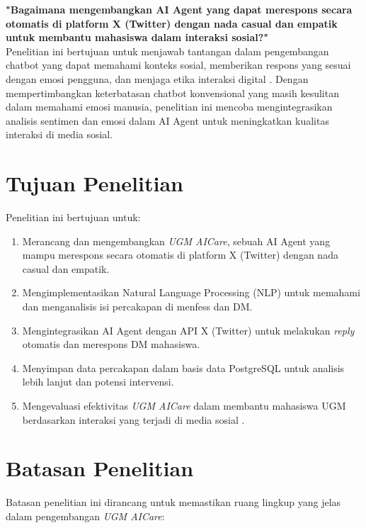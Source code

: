 \noindent
	\parbox{\textwidth}{%
		\noindent\textbf{"Bagaimana mengembangkan AI Agent yang dapat merespons secara otomatis di platform X (Twitter) dengan nada casual dan empatik untuk membantu mahasiswa dalam interaksi sosial?"} \\
		
		\hspace{1cm} Penelitian ini bertujuan untuk menjawab tantangan dalam pengembangan chatbot yang dapat memahami konteks sosial, memberikan respons yang sesuai dengan emosi pengguna, dan menjaga etika interaksi digital \cite{han2025chatbots}. Dengan mempertimbangkan keterbatasan chatbot konvensional yang masih kesulitan dalam memahami emosi manusia, penelitian ini mencoba mengintegrasikan analisis sentimen dan emosi dalam AI Agent untuk meningkatkan kualitas interaksi di media sosial.
	}%

\section{Tujuan Penelitian}

Penelitian ini bertujuan untuk:

\begin{enumerate}
	\item Merancang dan mengembangkan \textit{UGM AICare}, sebuah AI Agent yang mampu merespons secara otomatis di platform X (Twitter) dengan nada casual dan empatik.
	\item Mengimplementasikan Natural Language Processing (NLP) untuk memahami dan menganalisis isi percakapan di menfess dan DM.
	\item Mengintegrasikan AI Agent dengan API X (Twitter) untuk melakukan \textit{reply} otomatis dan merespons DM mahasiswa.
	\item Menyimpan data percakapan dalam basis data PostgreSQL untuk analisis lebih lanjut dan potensi intervensi.
	\item Mengevaluasi efektivitas \textit{UGM AICare} dalam membantu mahasiswa UGM berdasarkan interaksi yang terjadi di media sosial \cite{denecke2024ethical}.
\end{enumerate}

\section{Batasan Penelitian}

Batasan penelitian ini dirancang untuk memastikan ruang lingkup yang jelas dalam pengembangan \textit{UGM AICare}:

